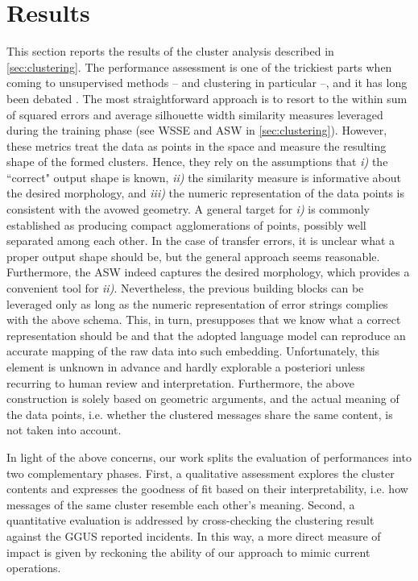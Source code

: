 \chapter{Results} 
\label{ch:opint-results}

This section reports the results of the cluster analysis described in \cref{sec:clustering}. 
The performance assessment is one of the trickiest parts when coming to unsupervised methods -- and clustering in particular --, and it has long been debated \cite{von2012clustering, guyon2009clustering}.
The most straightforward approach is to resort to the within sum of squared errors and average silhouette width similarity measures leveraged during the training phase (see WSSE and ASW in \cref{sec:clustering}).
However, these metrics treat the data as points in the space and measure the resulting shape of the formed clusters. 
Hence, they rely on the assumptions that \textit{i)} the ``correct" output shape is known, \textit{ii)} the similarity measure is informative about the desired morphology, and \textit{iii)} the numeric representation of the data points is consistent with the avowed geometry.
A general target for \textit{i)} is commonly established as producing compact agglomerations of points, possibly well separated among each other. 
In the case of transfer errors, it is unclear what a proper output shape should be, but the general approach seems reasonable. Furthermore, the ASW indeed captures the desired morphology, which provides a convenient tool for \textit{ii)}.
Nevertheless, the previous building blocks can be leveraged only as long as the numeric representation of error strings complies with the above schema. 
This, in turn, presupposes that we know what a correct representation should be and that the adopted language model can reproduce an accurate mapping of the raw data into such embedding.
Unfortunately, this element is unknown in advance and hardly explorable a posteriori unless recurring to human review and interpretation.
Furthermore, the above construction is solely based on geometric arguments, and the actual meaning of the data points, i.e. whether the clustered messages share the same content, is not taken into account.

In light of the above concerns, our work splits the evaluation of performances into two complementary phases.
First, a qualitative assessment explores the cluster contents and expresses the goodness of fit based on their interpretability, i.e. how messages of the same cluster resemble each other's meaning.
Second, a quantitative evaluation is addressed by cross-checking the clustering result against the GGUS reported incidents. In this way, a more direct measure of impact is given by reckoning the ability of our approach to mimic current operations.

